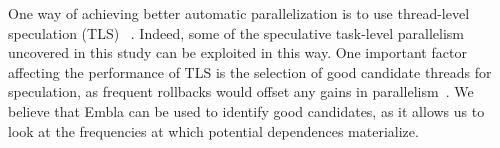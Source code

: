 One way of achieving better automatic parallelization is to use
thread-level speculation (TLS)~
\cite{Rundberg01anall-software,gregory05stampede,welc05safe}.
 Indeed, some of the speculative
task-level parallelism uncovered in this study can be exploited in
this way.  One important factor affecting the performance of TLS is
the selection of good candidate threads for speculation, as frequent
rollbacks would offset any gains in parallelism~\cite{johnson04mincut,liu06posh}.
 We believe that Embla can be used to identify good
candidates, as it allows us to look at the frequencies at which
potential dependences materialize.

